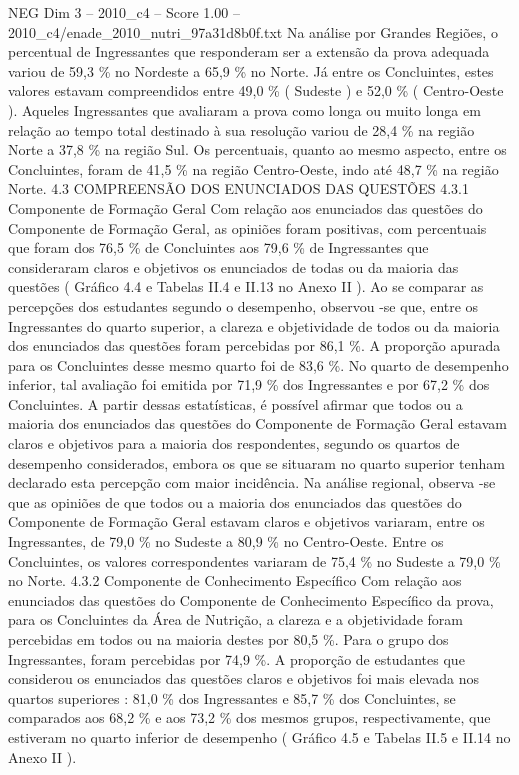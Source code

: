 \begin{textsample}{NEG Dim 3 – 2010\_c4 – Score 1.00 – 2010\_c4/enade\_2010\_nutri\_97a31d8b0f.txt}
Na análise por Grandes Regiões, o percentual de Ingressantes que responderam ser a extensão da prova adequada variou de 59,3 \% no Nordeste a 65,9 \% no Norte.
Já entre os Concluintes, estes valores estavam compreendidos entre 49,0 \% ( Sudeste ) e 52,0 \% ( Centro-Oeste ).
Aqueles Ingressantes que avaliaram a prova como longa ou muito longa em relação ao tempo total destinado à sua resolução variou de 28,4 \% na região Norte a 37,8 \% na região Sul.
Os percentuais, quanto ao mesmo aspecto, entre os Concluintes, foram de 41,5 \% na região Centro-Oeste, indo até 48,7 \% na região Norte. 4.3 COMPREENSÃO DOS ENUNCIADOS DAS QUESTÕES 4.3.1 Componente de Formação Geral Com relação aos enunciados das questões do Componente de Formação Geral, as opiniões foram positivas, com percentuais que foram dos 76,5 \% de Concluintes aos 79,6 \% de Ingressantes que consideraram claros e objetivos os enunciados de todas ou da maioria das questões ( Gráfico 4.4 e Tabelas II.4 e II.13 no Anexo II ).
Ao se comparar as percepções dos estudantes segundo o desempenho, observou -se que, entre os Ingressantes do quarto superior, a clareza e objetividade de todos ou da maioria dos enunciados das questões foram percebidas por 86,1 \%.
A proporção apurada para os Concluintes desse mesmo quarto foi de 83,6 \%.
No quarto de desempenho inferior, tal avaliação foi emitida por 71,9 \% dos Ingressantes e por 67,2 \% dos Concluintes.
A partir dessas estatísticas, é possível afirmar que todos ou a maioria dos enunciados das questões do Componente de Formação Geral estavam claros e objetivos para a maioria dos respondentes, segundo os quartos de desempenho considerados, embora os que se situaram no quarto superior tenham declarado esta percepção com maior incidência.
Na análise regional, observa -se que as opiniões de que todos ou a maioria dos enunciados das questões do Componente de Formação Geral estavam claros e objetivos variaram, entre os Ingressantes, de 79,0 \% no Sudeste a 80,9 \% no Centro-Oeste.
Entre os Concluintes, os valores correspondentes variaram de 75,4 \% no Sudeste a 79,0 \% no Norte. 4.3.2 Componente de Conhecimento Específico Com relação aos enunciados das questões do Componente de Conhecimento Específico da prova, para os Concluintes da Área de Nutrição, a clareza e a objetividade foram percebidas em todos ou na maioria destes por 80,5 \%.
Para o grupo dos Ingressantes, foram percebidas por 74,9 \%.
A proporção de estudantes que considerou os enunciados das questões claros e objetivos foi mais elevada nos quartos superiores : 81,0 \% dos Ingressantes e 85,7 \% dos Concluintes, se comparados aos 68,2 \% e aos 73,2 \% dos mesmos grupos, respectivamente, que estiveram no quarto inferior de desempenho ( Gráfico 4.5 e Tabelas II.5 e II.14 no Anexo II ).

\end{textsample}

